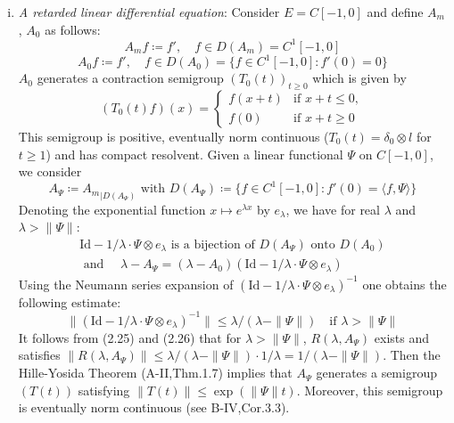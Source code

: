 \begin{example}
\begin{enumerate}[(i), wide]
\item \emph{A retarded linear differential equation}: 	
	Consider $E = C[-1,0]$ and define $A_{m}$, $A_{0}$ as follows:
	\begin{equation}\label{eq:b3-2.23}
		A_{m}f \coloneqq f', \quad f \in D(A_{m}) = C^{1}[-1,0]
	\end{equation}
	\begin{equation}\label{eq:b3-2.24}
		A_{0}f \coloneqq f', \quad f \in D(A_{0}) = \{f \in C^{1}[-1,0] \colon f'(0) = 0\}
	\end{equation}
	$A_{0}$ generates a contraction semigroup $(T_{0}(t))_{t \geq 0}$ which is given by
	\begin{equation}\label{eq:b3-2.25}
		(T_{0}(t)f)(x) = \begin{cases}
			f(x+t) & \text{if } x+t \leq 0, \\
			f(0) & \text{if } x+t \geq 0
		\end{cases}
	\end{equation}
	This semigroup is positive, eventually norm continuous ($T_{0}(t) = \delta_{0}\otimes l$ for $t \geq 1$) and has compact resolvent.
	Given a linear functional $\Psi$ on $C[-1,0]$, we consider
	\begin{equation}\label{eq:b3-2.26}
		A_{\Psi} \coloneqq {A_{m}}_{|D(A_{\Psi})} \text{ with } D(A_{\Psi}) \coloneqq \{f \in C^{1}[-1,0] \colon f'(0) = \langle f,\Psi \rangle\}
	\end{equation}
	Denoting the exponential function $x \mapsto e^{\lambda x}$ by $e_{\lambda}$, we have for real $\lambda$ and $\lambda > \|\Psi\|$:
	 \begin{equation}\label{eq:b3-2.27}
	 \begin{aligned}
		\text{Id} - 1/\lambda \cdot \Psi \otimes e_{\lambda} \text{ is a bijection of } D(A_{\Psi}) \text{ onto } D(A_{0})   \\
		\text{ and }\quad \lambda - A_{\Psi} = (\lambda - A_{0})(\text{Id} - 1/\lambda \cdot \Psi \otimes e_{\lambda})
	\end{aligned}
	\end{equation}
	Using the Neumann series expansion of $(\text{Id} - 1/\lambda \cdot \Psi \otimes e_{\lambda})^{-1}$ one obtains the following estimate:
	\begin{equation}\label{eq:b3-2.28}
		\|(\text{Id} - 1/\lambda \cdot \Psi \otimes e_{\lambda})^{-1}\| \leq \lambda/(\lambda - \|\Psi\|) \quad \text{if } \lambda > \|\Psi\|
	\end{equation}
%
%	
It follows from (2.25) and (2.26) that for $\lambda > \|\Psi\|$, $R(\lambda,A_{\Psi})$ exists and satisfies $\|R(\lambda,A_{\Psi})\| \leq \lambda/(\lambda-\|\Psi\|)\cdot 1/\lambda = 1/(\lambda-\|\Psi\|)$.
Then the Hille-Yosida Theorem (A-II,Thm.1.7) implies that $A_{\Psi}$ generates a semigroup $(T(t))$ satisfying $\|T(t)\| \leq \exp(\|\Psi\|t)$.
Moreover, this semigroup is eventually norm continuous (see B-IV,Cor.3.3).


\end{enumerate}
\end{example}
